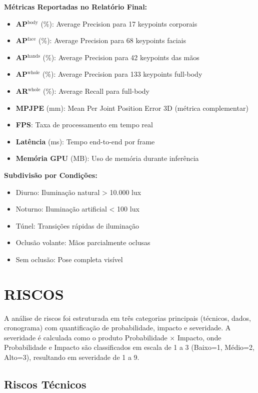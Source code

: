 \documentclass[12pt, a4paper]{article}
\begin{document}
\textbf{Métricas Reportadas no Relatório Final:}
\begin{itemize}
    \item \textbf{AP$^{\text{body}}$} (\%): Average Precision para 17 keypoints corporais
    \item \textbf{AP$^{\text{face}}$} (\%): Average Precision para 68 keypoints faciais
    \item \textbf{AP$^{\text{hands}}$} (\%): Average Precision para 42 keypoints das mãos
    \item \textbf{AP$^{\text{whole}}$} (\%): Average Precision para 133 keypoints full-body
    \item \textbf{AR$^{\text{whole}}$} (\%): Average Recall para full-body
    \item \textbf{MPJPE} (mm): Mean Per Joint Position Error 3D (métrica complementar)
    \item \textbf{FPS}: Taxa de processamento em tempo real
    \item \textbf{Latência} (ms): Tempo end-to-end por frame
    \item \textbf{Memória GPU} (MB): Uso de memória durante inferência
\end{itemize}

\textbf{Subdivisão por Condições:}
\begin{itemize}
    \item Diurno: Iluminação natural > 10.000 lux
    \item Noturno: Iluminação artificial < 100 lux
    \item Túnel: Transições rápidas de iluminação
    \item Oclusão volante: Mãos parcialmente oclusas
    \item Sem oclusão: Pose completa visível
\end{itemize}

\section{RISCOS}

A análise de riscos foi estruturada em três categorias principais (técnicos, dados, cronograma) com quantificação de probabilidade, impacto e severidade. A severidade é calculada como o produto Probabilidade × Impacto, onde Probabilidade e Impacto são classificados em escala de 1 a 3 (Baixo=1, Médio=2, Alto=3), resultando em severidade de 1 a 9.

\subsection{Riscos Técnicos}
\end{document}
